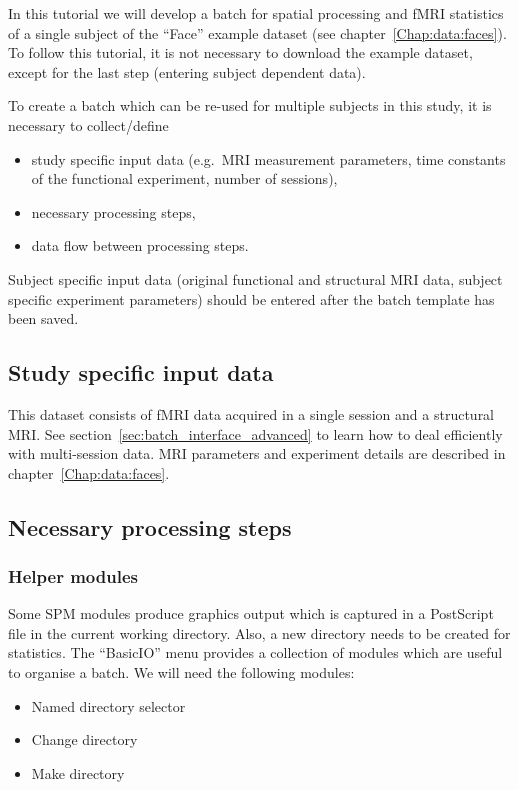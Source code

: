 In this tutorial we will develop a batch for spatial processing and fMRI
statistics of a single subject of the ``Face'' example dataset (see
chapter~\ref{Chap:data:faces}). To follow this tutorial, it is not necessary to
download the example dataset, except for the last step (entering subject
dependent data).

To create a batch which can be re-used for multiple subjects in this study, it
is necessary to collect/define
\begin{itemize}
\item study specific input data (e.g.\ MRI measurement parameters, time
  constants of the functional experiment, number of sessions),
\item necessary processing steps,
\item data flow between processing steps.
\end{itemize}
Subject specific input data (original functional and structural MRI data,
subject specific experiment parameters) should be entered after the batch
template has been saved.

\subsection{Study specific input data}

This dataset consists of fMRI data acquired in a single session and a
structural MRI. See section~\ref{sec:batch_interface_advanced} to learn how to
deal efficiently with multi-session data. MRI parameters and experiment
details are described in chapter~\ref{Chap:data:faces}.

\subsection{Necessary processing steps}

\subsubsection{Helper modules}

Some SPM modules produce graphics output which is captured in a PostScript
file in the current working directory. Also, a new directory needs to be
created for statistics. The ``BasicIO'' menu provides a collection of modules
which are useful to organise a batch. We will need the following modules:

\begin{itemize}
\item Named directory selector
\item Change directory
\item Make directory
\end{itemize}

